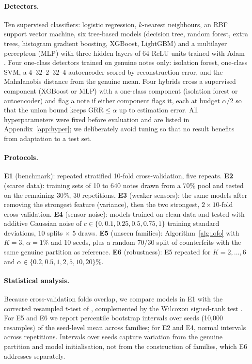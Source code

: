 \documentclass{article}
\theoremstyle{definition}
\theoremstyle{remark}
\newcommand{\GRR}{\mathrm{GRR}}
\begin{document}
\paragraph{Detectors.} Ten supervised classifiers: logistic regression, $k$-nearest neighbours, an RBF support vector machine, six tree-based models (decision tree, random forest, extra trees, histogram gradient boosting, XGBoost, LightGBM) and a multilayer perceptron (MLP) with three hidden layers of 64 ReLU units trained with Adam \citep{kingma2015adam}. Four one-class detectors trained on genuine notes only: isolation forest, one-class SVM, a $4$--$32$--$2$--$32$--$4$ autoencoder scored by reconstruction error, and the Mahalanobis distance from the genuine mean. Four hybrids cross a supervised component (XGBoost or MLP) with a one-class component (isolation forest or autoencoder) and flag a note if either component flags it, each at budget $\alpha/2$ so that the union bound keeps $\GRR\le\alpha$ up to estimation error. All hyperparameters were fixed before evaluation and are listed in Appendix~\ref{app:hyper}; we deliberately avoid tuning so that no result benefits from adaptation to a test set.

\paragraph{Protocols.}
\textbf{E1} (benchmark): repeated stratified 10-fold cross-validation, five repeats. \textbf{E2} (scarce data): training sets of 10 to 640 notes drawn from a 70\% pool and tested on the remaining 30\%, 30 repetitions. \textbf{E3} (weaker sensors): the same models after removing the strongest feature (variance), then the two strongest, $2\times10$-fold cross-validation. \textbf{E4} (sensor noise): models trained on clean data and tested with additive Gaussian noise of $c\in\{0,0.1,0.25,0.5,0.75,1\}$ training standard deviations, 10 splits $\times$ 5 draws. \textbf{E5} (unseen families): Algorithm~\ref{alg:lofo} with $K=3$, $\alpha=1\%$ and 10 seeds, plus a random 70/30 split of counterfeits with the same genuine partition as reference. \textbf{E6} (robustness): E5 repeated for $K=2,\dots,6$ and $\alpha\in\{0.2,0.5,1,2,5,10,20\}\%$.

\paragraph{Statistical analysis.} Because cross-validation folds overlap, we compare models in E1 with the corrected resampled $t$-test of \citet{nadeau2003inference}, complemented by the Wilcoxon signed-rank test \citep{bouckaert2004evaluating,demsar2006statistical}. For E5 and E6 we report percentile bootstrap intervals \citep{efron1994introduction} over seeds (10,000 resamples) of the seed-level mean across families; for E2 and E4, normal intervals across repetitions. Intervals over seeds capture variation from the genuine partition and model initialisation, not from the construction of families, which E6 addresses separately.
\end{document}
